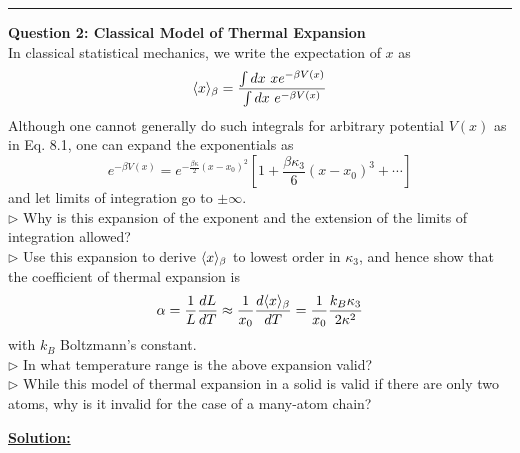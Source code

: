 \documentclass[11pt]{article}
\begin{document}
\vskip 0.5cm
\hrule
\pagebreak


\begin{bluebox}
  \textbf{Question 2: Classical Model of Thermal Expansion} \\
  In classical statistical mechanics, we write the expectation of $x$ as $$ \langle x \rangle_{\beta} = \frac{\int dx~xe^{-\beta V(x)}}{\int dx~e^{-\beta V(x)}} $$ Although one cannot generally do such integrals for arbitrary potential $V(x)$ as in Eq. 8.1, one can expand the exponentials as $$ e^{-\beta V(x)} = e^{- \frac{\beta \kappa}{2} (x-x_0)^2 } \left[ 1 + \frac{\beta \kappa_3}{6} (x-x_0)^3 + \cdots \right] $$ and let limits of integration go to $\pm \infty$. \\
  $\triangleright$ Why is this expansion of the exponent and the extension of the limits of integration allowed? \\
  $\triangleright$ Use this expansion to derive $\langle x \rangle_{\beta}$ to lowest order in $\kappa_3$, and hence show that the coefficient of thermal expansion is $$ \alpha = \frac{1}{L} \frac{dL}{dT} \approx \frac{1}{x_0} \frac{d\langle x \rangle_{\beta}}{dT} = \frac{1}{x_0} \frac{k_B \kappa_3}{2\kappa^2} $$ with $k_B$ Boltzmann's constant. \\
  $\triangleright$ In what temperature range is the above expansion valid? \\
  $\triangleright$ While this model of thermal expansion in a solid is valid if there are only two atoms, why is it invalid for the case of a many-atom chain? 
\end{bluebox}

\vskip 0.5cm
\textbf{\underline{Solution:}}
\end{document}
